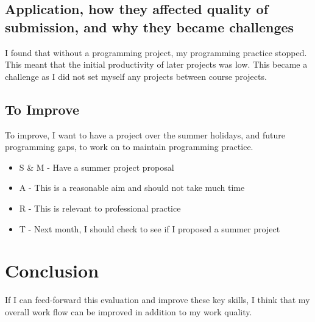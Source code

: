 \documentclass{scrartcl}
\begin{document}
\subsection*{Application, how they affected quality of submission, and why they became challenges}
I found that without a programming project, my programming practice stopped. This meant that the initial productivity of later projects was low. This became a challenge as I did not set myself any projects between course projects.

\subsection*{To Improve}
To improve, I want to have a project over the summer holidays, and future programming gaps, to work on to maintain programming practice.

 \begin{itemize}
   \item  S \& M - Have a summer project proposal
	\item A - This is a reasonable aim and should not take much time
	\item R - This is relevant to professional practice
	\item T - Next month, I should check to see if I proposed a summer project
 \end{itemize}
 
 \section*{Conclusion}
 If I can feed-forward this evaluation and improve these key skills, I think that my overall work flow can be improved in addition to my work quality.
\end{document}
